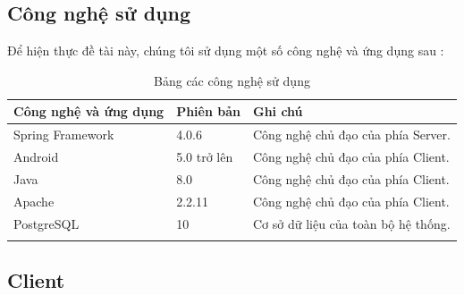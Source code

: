 \documentclass[a4paper]{article}
\begin{document}
\subsection{Công nghệ sử dụng}
Để hiện thực đề tài này, chúng tôi sử dụng một số công nghệ và ứng dụng sau : 
\begin{longtable}{ | p{} |p{} | p{}  | } 
\hline
\textbf{Công nghệ và ứng dụng}& \textbf{Phiên bản}& \textbf{Ghi chú} \\ 
\hline
\hline
Spring Framework &
4.0.6 &
Công nghệ chủ đạo của phía Server.
\\ 
\hline
Android  &
5.0 trở lên &
Công nghệ chủ đạo của phía Client.
\\ 
\hline
Java  &
8.0 &
Công nghệ chủ đạo của phía Client.
\\ 
\hline
Apache  &
2.2.11 &
Công nghệ chủ đạo của phía Client.
\\ 
\hline
PostgreSQL  &
10 &
Cơ sở dữ liệu của toàn bộ hệ thống.
\\ 

\hline

\caption{Bảng các công nghệ sử dụng}
\end{longtable}
\subsection{Client}
\end{document}
